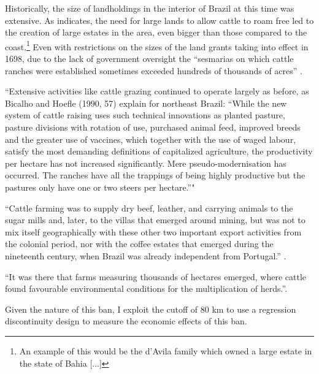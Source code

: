 \documentclass{article}
\begin{document}
Historically, the size of landholdings in the interior of Brazil at this time was extensive. 
As \textcite[p~.41]{Fausto2014-bh} indicates, the need for large lands to allow cattle to roam free led to the creation of large estates in the area, even bigger than those compared to the coast.\footnote{An example of this would be the d'Avila family which owned a large estate in the state of Bahia [...]}
Even with restrictions on the sizes of the land grants taking into effect in 1698, due to the lack of government oversight the  ``sesmarias on which cattle ranches were established sometimes exceeded hundreds of thousands of acres'' \parencite{Bethell1984-of}.

\parencite{Carlson2019-mk} ``Extensive  activities  like  
cattle grazing continued to operate largely as before, as Bicalho and Hoefle (1990, 57) explain for northeast  Brazil: “While the new system of cattle raising uses such technical innovations as planted pasture, pasture  divisions with rotation of use, purchased animal feed, improved breeds and the greater use of vaccines, which  together  with  the  use  of  waged  labour,  satisfy  the  most  demanding  definitions  of  capitalized  agriculture,   the productivity per hectare has not increased significantly. Mere pseudo-modernisation has occurred. The  ranches have all the trappings of being highly productive but the pastures only have one or two steers per  hectare.”"

\parencite[p~.]{Boxer1962-bj}

``Cattle farming was to supply dry beef, leather, and carrying animals to the sugar mills and, later, to the villas that emerged around mining, but was not to mix itself geographically with these other two important export activities from the colonial period, nor with the coffee estates that emerged during the nineteenth century,  when  Brazil was already independent from  Portugal.'' \parencite{Ribeiro2012-lb}.

``It was there that farms measuring thousands of hectares emerged, where cattle found favourable environmental conditions for the multiplication of herds.''\parencite{Ribeiro2012-lb}.


Given the nature of this ban, I exploit the cutoff of 80 km to use a regression discontinuity design to measure the economic effects of this ban. 
\end{document}
